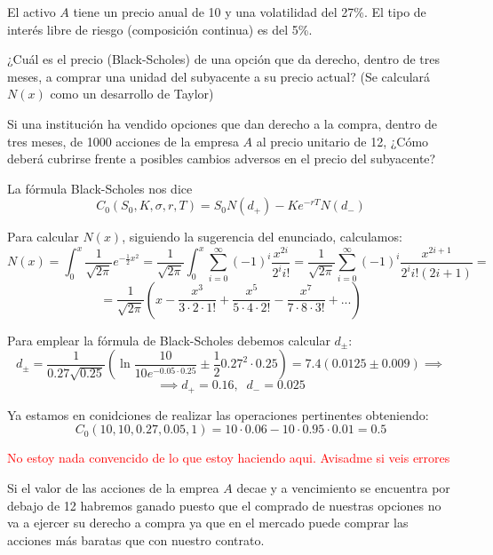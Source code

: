 \begin{problem}[7]
El activo $A$ tiene un precio anual de 10 y una volatilidad del 27\%. El tipo de interés libre de riesgo (composición continua) es del 5\%.

\ppart ¿Cuál es el precio (Black-Scholes) de una opción que da derecho, dentro de tres meses, a comprar una unidad del subyacente a su precio actual? (Se calculará $N(x)$ como un desarrollo de Taylor)

\ppart Si una institución ha vendido opciones que dan derecho a la compra, dentro de tres meses, de 1000 acciones de la empresa $A$ al precio unitario de 12, ¿Cómo deberá cubrirse frente a posibles cambios adversos en el precio del subyacente?
\solution
{}

\spart

La fórmula Black-Scholes nos dice
\[C_0(S_0,K,σ,r,T) = S_0N(d_+)-Ke^{-rT}N(d_-)\]

Para calcular $N(x)$, siguiendo la sugerencia del enunciado, calculamos:
\[N(x) = \int_{0}^{x}\frac{1}{\sqrt{2π}}e^{-\frac{1}{2}x^2} = \frac{1}{\sqrt{2π}}\int_0^x\sum_{i=0}^{\infty}(-1)^i\frac{x^{2i}}{2^ii!} = \frac{1}{\sqrt{2π}}\sum_{i=0}^{\infty}(-1)^i\frac{x^{2i+1}}{2^ii!(2i+1)} =\]
\[=\frac{1}{\sqrt{2π}}\left(x-\frac{x^3}{3 \cdot 2 \cdot 1!} +\frac{x^5}{5 \cdot 4 \cdot 2!} - \frac{x^7}{7\cdot 8 \cdot 3!}+...\right)\]

Para emplear la fórmula de Black-Scholes debemos calcular $d_{\pm}$:
\[d_{\pm} = \frac{1}{0.27\sqrt{0.25}}\left(\ln \frac{10}{10e^{-0.05\cdot 0.25}}\pm\frac{1}{2}0.27^2 \cdot 0.25\right)=7.4 \left(0.0125 \pm 0.009\right) \implies\]
\[\implies d_+ = 0.16, \;\; d_-=0.025 \]

Ya estamos en conidciones de realizar las operaciones pertinentes obteniendo:
\[C_0(10,10,0.27,0.05,1) = 10 \cdot 0.06 - 10\cdot 0.95 \cdot 0.01 = 0.5\]

\spart

\textcolor{red}{No estoy nada convencido de lo que estoy haciendo aqui. Avisadme si veis errores}


Si el valor de las acciones de la emprea $A$ decae y a vencimiento se encuentra por debajo de 12 habremos ganado puesto que el comprado de nuestras opciones no va a ejercer su derecho a compra ya que en el mercado puede comprar las acciones más baratas que con nuestro contrato.


\end{problem}
